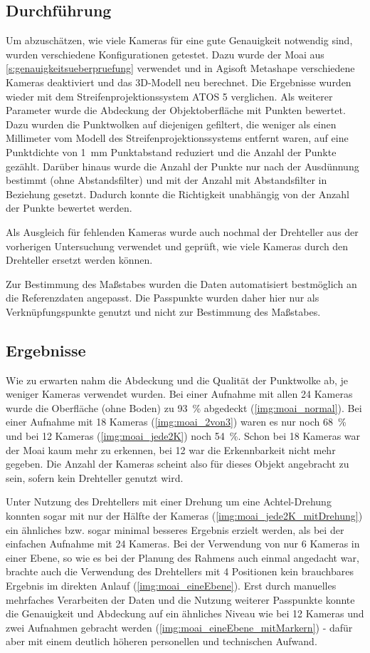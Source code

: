 \documentclass[./00PhotoBox.tex]{subfiles}
\begin{document}
\subsection{Durchführung}
Um abzuschätzen, wie viele Kameras für eine gute Genauigkeit notwendig sind, wurden verschiedene Konfigurationen getestet. Dazu wurde der Moai aus \autoref{s:genauigkeitsueberpruefung} verwendet und in Agisoft Metashape verschiedene Kameras deaktiviert und das 3D-Modell neu berechnet. Die Ergebnisse wurden wieder mit dem Streifenprojektionssystem ATOS 5 verglichen. Als weiterer Parameter wurde die Abdeckung der Objektoberfläche mit Punkten bewertet. Dazu wurden die Punktwolken auf diejenigen gefiltert, die weniger als einen Millimeter vom Modell des Streifenprojektionssystems entfernt waren, auf eine Punktdichte von 1~mm Punktabstand reduziert und die Anzahl der Punkte gezählt. Darüber hinaus wurde die Anzahl der Punkte nur nach der Ausdünnung bestimmt (ohne Abstandsfilter) und mit der Anzahl mit Abstandsfilter in Beziehung gesetzt. Dadurch konnte  die Richtigkeit unabhängig von der Anzahl der Punkte bewertet werden.

Als Ausgleich für fehlenden Kameras wurde auch nochmal der Drehteller aus der vorherigen Untersuchung verwendet und geprüft, wie viele Kameras durch den Drehteller ersetzt werden können.

Zur Bestimmung des Maßstabes wurden die Daten automatisiert bestmöglich an die Referenzdaten angepasst. Die Passpunkte wurden daher hier nur als Verknüpfungspunkte genutzt und nicht zur Bestimmung des Maßstabes.

\subsection{Ergebnisse}
Wie zu erwarten nahm die Abdeckung und die Qualität der Punktwolke ab, je weniger Kameras verwendet wurden. Bei einer Aufnahme mit allen 24 Kameras wurde die Oberfläche (ohne Boden) zu 93~\% abgedeckt (\autoref{img:moai_normal}). Bei einer Aufnahme mit 18 Kameras (\autoref{img:moai_2von3}) waren es nur noch 68~\% und bei 12 Kameras (\autoref{img:moai_jede2K}) noch 54~\%.  Schon bei 18 Kameras war der Moai kaum mehr zu erkennen, bei 12 war die Erkennbarkeit nicht mehr gegeben. Die Anzahl der Kameras scheint also für dieses Objekt angebracht zu sein, sofern kein Drehteller genutzt wird.

Unter Nutzung des Drehtellers mit einer Drehung um eine Achtel-Drehung konnten sogar mit nur der Hälfte der Kameras (\autoref{img:moai_jede2K_mitDrehung}) ein ähnliches bzw. sogar minimal besseres Ergebnis erzielt werden, als bei der einfachen Aufnahme mit 24 Kameras. Bei der Verwendung von nur 6 Kameras in einer Ebene, so wie es bei der Planung des Rahmens auch einmal angedacht war, brachte auch die Verwendung des Drehtellers mit 4 Positionen kein brauchbares Ergebnis im direkten Anlauf (\autoref{img:moai_eineEbene}). Erst durch manuelles mehrfaches Verarbeiten der Daten und die Nutzung weiterer Passpunkte konnte die Genauigkeit und Abdeckung auf ein ähnliches Niveau wie bei 12 Kameras und zwei Aufnahmen gebracht werden (\autoref{img:moai_eineEbene_mitMarkern}) - dafür aber mit einem deutlich höheren personellen und technischen Aufwand.
\end{document}
